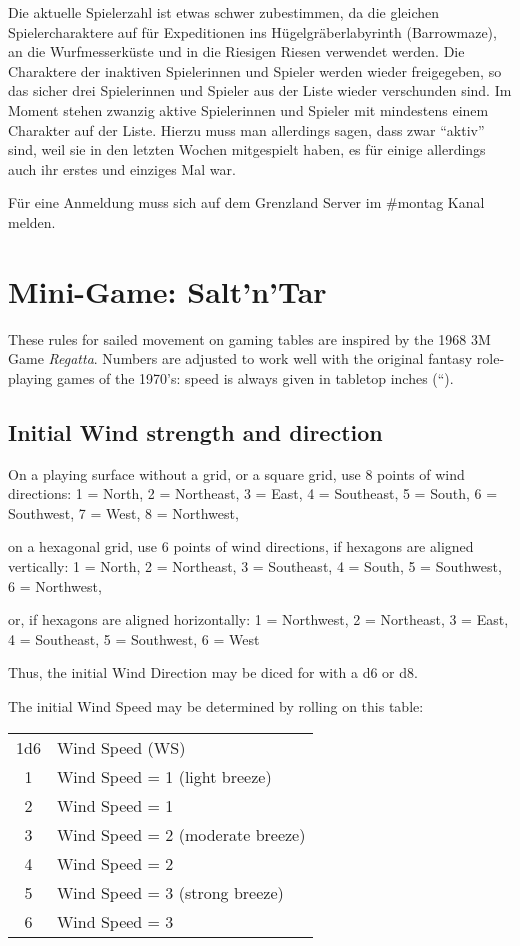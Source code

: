 \documentclass[11pt]{wbzine}
\begin{document}
\begin{multicols}{2}
\begin{description}
	Die aktuelle Spielerzahl ist etwas schwer zubestimmen, da
	die gleichen Spielercharaktere auf für Expeditionen ins
	Hügelgräberlabyrinth (Barrowmaze), an die Wurfmesserküste
	und in die Riesigen Riesen verwendet werden. Die Charaktere
	der inaktiven Spielerinnen und Spieler werden wieder
	freigegeben, so das sicher drei Spielerinnen und Spieler aus
	der Liste wieder verschunden sind. Im Moment stehen zwanzig
	aktive Spielerinnen und Spieler mit mindestens einem
	Charakter auf der Liste. Hierzu muss man allerdings sagen,
	dass zwar “aktiv” sind, weil sie in den letzten Wochen
	mitgespielt haben, es für einige allerdings auch ihr erstes
	und einziges Mal war.

	Für eine Anmeldung muss sich auf dem Grenzland Server im
	\#montag Kanal melden.


\end{description}

\section{Mini-Game: Salt'n'Tar}

These rules for sailed movement on gaming tables are inspired by the
1968 3M Game \emph{Regatta}. Numbers are adjusted to work well with the
original fantasy role-playing games of the 1970's: speed is always given
in tabletop inches (``).

\subsection{Initial Wind strength and
direction}

On a playing surface without a grid, or a square grid, use 8 points of
wind directions: 1 = North, 2 = Northeast, 3 = East, 4 = Southeast, 5 =
South, 6 = Southwest, 7 = West, 8 = Northwest,

on a hexagonal grid, use 6 points of wind directions, if hexagons are
aligned vertically: 1 = North, 2 = Northeast, 3 = Southeast, 4 = South,
5 = Southwest, 6 = Northwest,

or, if hexagons are aligned horizontally: 1 = Northwest, 2 = Northeast,
3 = East, 4 = Southeast, 5 = Southwest, 6 = West

Thus, the initial Wind Direction may be diced for with a d6 or d8.

The initial Wind Speed may be determined by rolling on this table:

\begin{tabularx}{\columnwidth}{cZ}
1d6 & Wind Speed (WS) \\
1 & Wind Speed = 1 (light breeze) \\
2 & Wind Speed = 1 \\
3 & Wind Speed = 2 (moderate breeze) \\
4 & Wind Speed = 2 \\
5 & Wind Speed = 3 (strong breeze) \\
6 & Wind Speed = 3 \\
\end{tabularx}


\end{multicols}
\end{document}
